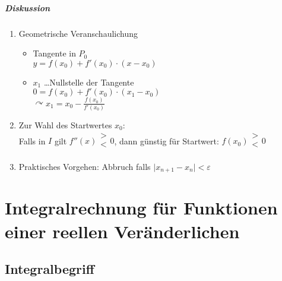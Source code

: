 \documentclass[a4paper]{scrartcl}
\begin{document}
\subparagraph{Diskussion}
\begin{enumerate}
\item Geometrische Veranschaulichung
\begin{itemize}
\item Tangente in $P_0$\\
$y = f(x_0) + f'(x_0) \cdot (x - x_0)$
\item $x_1$ \dots Nullstelle der Tangente\\
$0 = f(x_0) + f'(x_0) \cdot (x_1 - x_0)$\\
$\curvearrowright x_1 = x_0 - \frac{f(x_0)}{f'(x_0)}$
\end{itemize}
\item Zur Wahl des Startwertes $x_0$:\\
Falls in $I$ gilt $f''(x) \begin{array}{c} > \\ < \\ \end{array} 0$, dann günstig für Startwert: $f (x_0) \begin{array}{c} > \\ < \\ \end{array} 0$
\item Praktisches Vorgehen: Abbruch falls $\lvert x_{n+1} - x_n \rvert < \varepsilon$
\end{enumerate}

\section{Integralrechnung für Funktionen einer reellen Veränderlichen}
\subsection{Integralbegriff}
\end{document}
